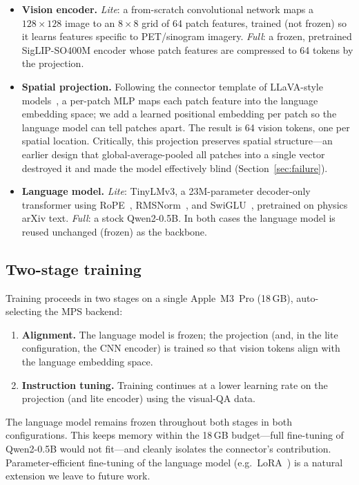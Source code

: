 \documentclass[11pt]{article}
\begin{document}
\begin{itemize}[leftmargin=*]
    \item \textbf{Vision encoder.} \emph{Lite}: a from-scratch convolutional
    network maps a $128\times128$ image to an $8\times8$ grid of 64 patch
    features, trained (not frozen) so it learns features specific to
    PET/sinogram imagery. \emph{Full}: a frozen, pretrained SigLIP-SO400M encoder
    whose patch features are compressed to 64 tokens by the projection.
    \item \textbf{Spatial projection.} Following the connector template of
    LLaVA-style models~\cite{liu2023llava,liu2024improved}, a per-patch MLP maps
    each patch feature into the language embedding space; we add a learned
    positional embedding per patch so the language model can tell patches apart.
    The result is 64 vision tokens, one per spatial location. Critically, this
    projection preserves spatial structure---an earlier design that
    global-average-pooled all patches into a single vector destroyed it and made
    the model effectively blind (Section~\ref{sec:failure}).
    \item \textbf{Language model.} \emph{Lite}: TinyLMv3, a 23M-parameter
    decoder-only transformer using RoPE~\cite{su2021rope},
    RMSNorm~\cite{zhang2019rmsnorm}, and SwiGLU~\cite{shazeer2020glu}, pretrained
    on physics arXiv text. \emph{Full}: a stock Qwen2-0.5B. In both cases the
    language model is reused unchanged (frozen) as the backbone.
\end{itemize}

\subsection{Two-stage training}

Training proceeds in two stages on a single Apple~M3~Pro (18\,GB), auto-selecting
the MPS backend:
\begin{enumerate}[leftmargin=*]
    \item \textbf{Alignment.} The language model is frozen; the projection (and,
    in the lite configuration, the CNN encoder) is trained so that vision tokens
    align with the language embedding space.
    \item \textbf{Instruction tuning.} Training continues at a lower learning
    rate on the projection (and lite encoder) using the visual-QA data.
\end{enumerate}
The language model remains frozen throughout both stages in both
configurations. This keeps memory within the 18\,GB budget---full fine-tuning of
Qwen2-0.5B would not fit---and cleanly isolates the connector's contribution.
Parameter-efficient fine-tuning of the language model (e.g.\ LoRA~\cite{hu2021lora})
is a natural extension we leave to future work.
\end{document}
